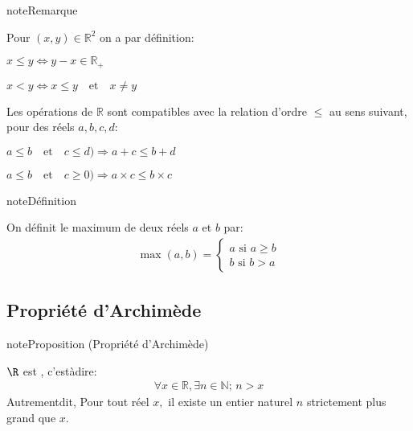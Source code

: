 \documentclass[letterpaper,10pt,french]{jupyterBook}
\begin{document}
\begin{sphinxadmonition}{note}{Remarque}

\sphinxAtStartPar
Pour \((x, y)\in \mathbb{R}^{2}\) on a par définition:

\sphinxAtStartPar
\(x\leq y \Leftrightarrow y-x\in \mathbb{R}_{+}\)

\sphinxAtStartPar
\(x<y\Leftrightarrow x\leq y\quad\mbox{et}\quad x\neq y\)

\sphinxAtStartPar
Les opérations de \(\mathbb{R}\) sont compatibles avec la relation d’ordre \(\leq\) au sens suivant, pour des réels \(a, b,c, d:\)

\sphinxAtStartPar
\(a\leq b \quad\mbox{et}\quad c\leq d)\Rightarrow a+c\leq b+d\)

\sphinxAtStartPar
\(a\leq b \quad\mbox{et}\quad c\geq0)\Rightarrow a\times c\leq b\times c\)
\end{sphinxadmonition}

\begin{sphinxadmonition}{note}{Définition}

\sphinxAtStartPar
On définit le maximum de deux réels \(a\) et \(b\) par:
\begin{equation*}
\begin{split}
\max(a,b)=\left\{
\begin{array}{ll}
a\mbox{ si } a\geq b\\
b \mbox{ si } b>a
\end{array}
\right.
\end{split}
\end{equation*}\end{sphinxadmonition}


\subsection{Propriété d’Archimède}
\label{\detokenize{proprties:propriete-d-archimede}}
\begin{sphinxadmonition}{note}{Proposition (Propriété d’Archimède)}

\sphinxAtStartPar
\(\R\) est , c’est\sphinxhyphen{}à\sphinxhyphen{}dire:
\begin{equation*}
\begin{split}
\forall x\in \mathbb{R},\exists n\in \mathbb{N};\,n> x
\end{split}
\end{equation*}
\sphinxAtStartPar
Autrementdit, Pour tout réel \(x,\) il existe un entier naturel \(n\) strictement plus grand que \(x.\)
\end{sphinxadmonition}
\end{document}
